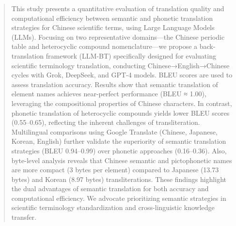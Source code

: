 \documentclass[conference]{IEEEtran}
\begin{document}
\begin{CJK*}{UTF8}{gbsn}
\begin{abstract}
This study presents a quantitative evaluation of translation quality and computational efficiency between semantic and phonetic translation strategies for Chinese scientific terms, using Large Language Models (LLMs). Focusing on two representative domains—the Chinese periodic table and heterocyclic compound nomenclature—we propose a back-translation framework (LLM-BT) specifically designed for evaluating scientific terminology translation, conducting Chinese→English→Chinese cycles with Grok, DeepSeek, and GPT-4 models. BLEU scores are used to assess translation accuracy. Results show that semantic translation of element names achieves near-perfect performance (BLEU ≈ 1.00), leveraging the compositional properties of Chinese characters. In contrast, phonetic translation of heterocyclic compounds yields lower BLEU scores (0.55–0.65), reflecting the inherent challenges of transliteration. Multilingual comparisons using Google Translate (Chinese, Japanese, Korean, English) further validate the superiority of semantic translation strategies (BLEU 0.94–0.99) over phonetic approaches (0.16–0.36). Also, byte-level analysis reveals that Chinese semantic and pictophonetic names are more compact (3 bytes per element) compared to Japanese (13.73 bytes) and Korean (8.97 bytes) transliterations. These findings highlight the dual advantages of semantic translation for both accuracy and computational efficiency. We advocate prioritizing semantic strategies in scientific terminology standardization and cross-linguistic knowledge transfer.


\end{abstract}
\end{CJK*}
\end{document}
